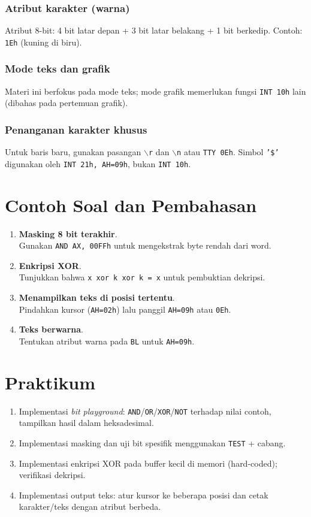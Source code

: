\documentclass[../main.tex]{subfiles}
\begin{document}
\subsubsection{Atribut karakter (warna)}
Atribut 8-bit: 4 bit latar depan + 3 bit latar belakang + 1 bit berkedip. Contoh: \texttt{1Eh} (kuning di biru).

\subsubsection{Mode teks dan grafik}
Materi ini berfokus pada mode teks; mode grafik memerlukan fungsi \texttt{INT 10h} lain (dibahas pada pertemuan grafik).

\subsubsection{Penanganan karakter khusus}
Untuk baris baru, gunakan pasangan \texttt{$\backslash$r} dan \texttt{$\backslash$n} atau \texttt{TTY 0Eh}. Simbol \texttt{'\$'} digunakan oleh \texttt{INT 21h, AH=09h}, bukan \texttt{INT 10h}.

\section{Contoh Soal dan Pembahasan}
\begin{enumerate}
  \item \textbf{Masking 8 bit terakhir}.\\ Gunakan \texttt{AND AX, 00FFh} untuk mengekstrak byte rendah dari word.
  \item \textbf{Enkripsi XOR}.\\ Tunjukkan bahwa \texttt{x xor k xor k = x} untuk pembuktian dekripsi.
  \item \textbf{Menampilkan teks di posisi tertentu}.\\ Pindahkan kursor (\texttt{AH=02h}) lalu panggil \texttt{AH=09h} atau \texttt{0Eh}.
  \item \textbf{Teks berwarna}.\\ Tentukan atribut warna pada \texttt{BL} untuk \texttt{AH=09h}.
\end{enumerate}

\section{Praktikum}
\begin{enumerate}
  \item Implementasi \textit{bit playground}: \texttt{AND}/\texttt{OR}/\texttt{XOR}/\texttt{NOT} terhadap nilai contoh, tampilkan hasil dalam heksadesimal.
  \item Implementasi masking dan uji bit spesifik menggunakan \texttt{TEST} + cabang.
  \item Implementasi enkripsi XOR pada buffer kecil di memori (hard-coded); verifikasi dekripsi.
  \item Implementasi output teks: atur kursor ke beberapa posisi dan cetak karakter/teks dengan atribut berbeda.
\end{enumerate}
\end{document}
